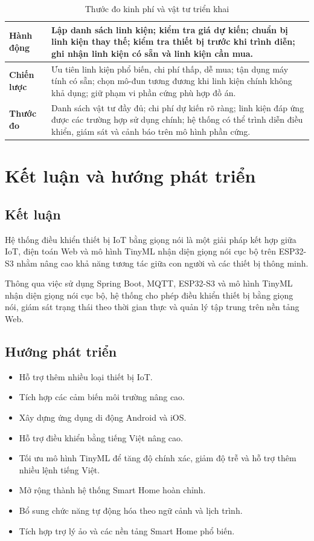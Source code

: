 \documentclass[a4paper,12pt]{article}
\begin{document}
\begin{table}[H]
\centering
\caption{Thước đo kinh phí và vật tư triển khai}
\small
\begin{tabularx}{\linewidth}{|p{3cm}|X|}
\hline
\textbf{Hành động} & Lập danh sách linh kiện; kiểm tra giá dự kiến; chuẩn bị linh kiện thay thế; kiểm tra thiết bị trước khi trình diễn; ghi nhận linh kiện có sẵn và linh kiện cần mua. \\
\hline
\textbf{Chiến lược} & Ưu tiên linh kiện phổ biến, chi phí thấp, dễ mua; tận dụng máy tính có sẵn; chọn mô-đun tương đương khi linh kiện chính không khả dụng; giữ phạm vi phần cứng phù hợp đồ án. \\
\hline
\textbf{Thước đo} & Danh sách vật tư đầy đủ; chi phí dự kiến rõ ràng; linh kiện đáp ứng được các trường hợp sử dụng chính; hệ thống có thể trình diễn điều khiển, giám sát và cảnh báo trên mô hình phần cứng. \\
\hline
\end{tabularx}
\end{table}

\section{Kết luận và hướng phát triển}

\subsection{Kết luận}

Hệ thống điều khiển thiết bị IoT bằng giọng nói là một giải pháp kết hợp giữa IoT, điện toán Web và mô hình TinyML nhận diện giọng nói cục bộ trên ESP32-S3 nhằm nâng cao khả năng tương tác giữa con người và các thiết bị thông minh.

Thông qua việc sử dụng Spring Boot, MQTT, ESP32-S3 và mô hình TinyML nhận diện giọng nói cục bộ, hệ thống cho phép điều khiển thiết bị bằng giọng nói, giám sát trạng thái theo thời gian thực và quản lý tập trung trên nền tảng Web.

\subsection{Hướng phát triển}

\begin{itemize}
\item Hỗ trợ thêm nhiều loại thiết bị IoT.
\item Tích hợp các cảm biến môi trường nâng cao.
\item Xây dựng ứng dụng di động Android và iOS.
\item Hỗ trợ điều khiển bằng tiếng Việt nâng cao.
\item Tối ưu mô hình TinyML để tăng độ chính xác, giảm độ trễ và hỗ trợ thêm nhiều lệnh tiếng Việt.
\item Mở rộng thành hệ thống Smart Home hoàn chỉnh.
\item Bổ sung chức năng tự động hóa theo ngữ cảnh và lịch trình.
\item Tích hợp trợ lý ảo và các nền tảng Smart Home phổ biến.
\end{itemize}
\end{document}
